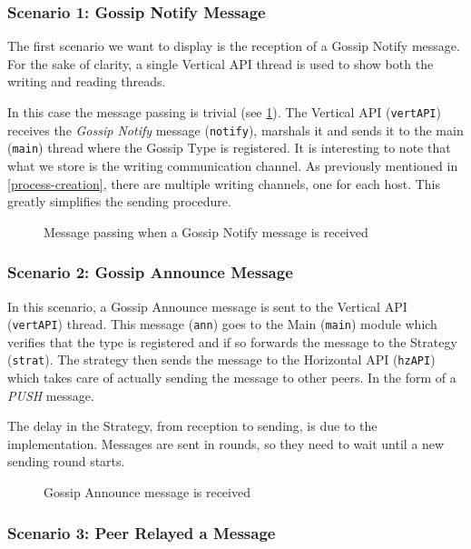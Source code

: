 \documentclass[a4paper,english,10pt,NET]{tumarticle}
\begin{document}
\subsubsection{Scenario 1: Gossip Notify Message}

The first scenario we want to display is the reception of a Gossip Notify message. For the sake of clarity, a single Vertical API thread is used to show both the writing and reading threads.

In this case the message passing is trivial (see \cref{fig:msg-notify}). The Vertical API (\texttt{vertAPI}) receives the \textit{Gossip Notify} message (\texttt{notify}), marshals it and sends it to the main (\texttt{main}) thread where the Gossip Type is registered. It is interesting to note that what we store is the writing communication channel. As previously mentioned in \cref{process-creation}, there are multiple writing channels, one for each host. This greatly simplifies the sending procedure.

\begin{figure}
	\centering
	
	\caption{Message passing when a Gossip Notify message is received}
	\label{fig:msg-notify}
\end{figure}

\subsubsection{Scenario 2: Gossip Announce Message}

In this scenario, a Gossip Announce message is sent to the Vertical API (\texttt{vertAPI}) thread. This message (\texttt{ann}) goes to the Main (\texttt{main}) module which verifies that the type is registered and if so forwards the message to the Strategy (\texttt{strat}). The strategy then sends the message to the Horizontal API (\texttt{hzAPI}) which takes care of actually sending the message to other peers. In the form of a \textit{PUSH} message. 

The delay in the Strategy, from reception to sending, is due to the implementation. Messages are sent in rounds, so they need to wait until a new sending round starts.

\begin{figure}
	\centering
	
	\caption{Gossip Announce message is received}
	\label{fig:msg-announce}
\end{figure}


\subsubsection{Scenario 3: Peer Relayed a Message}
\end{document}

